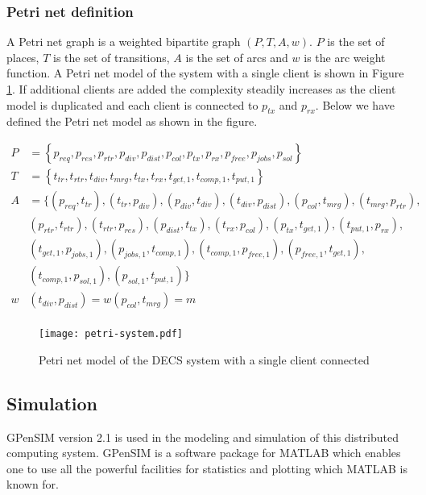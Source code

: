 \subsubsection{Petri net definition}

A Petri net graph is a weighted bipartite graph $(P, T, A, w)$.
$P$ is the set of places, $T$ is the set of transitions, $A$ is the set of arcs and $w$ is the arc weight function.
A Petri net model of the system with a single client is shown in Figure \ref{fig:petri-system}.
If additional clients are added the complexity steadily increases as the client model is duplicated and each client is connected to $p_{tx}$ and $p_{rx}$.
Below we have defined the Petri net model as shown in the figure.

\begin{align*} 
P &= \left\{p_{req}, p_{res}, p_{rtr}, p_{div}, p_{dist}, p_{col}, p_{tx}, p_{rx}, p_{free}, p_{jobs}, p_{sol}\right\} \\
T &= \left\{t_{tr}, t_{rtr}, t_{div}, t_{mrg}, t_{tx}, t_{rx}, t_{get,1}, t_{comp,1}, t_{put,1}\right\} \\
A &= \{(p_{req}, t_{tr}), (t_{tr}, p_{div}), (p_{div}, t_{div}), (t_{div}, p_{dist}), (p_{col}, t_{mrg}), (t_{mrg}, p_{rtr}), \\
&(p_{rtr}, t_{rtr}), (t_{rtr}, p_{res}), (p_{dist}, t_{tx}), (t_{rx}, p_{col}), (p_{tx}, t_{get,1}), (t_{put,1}, p_{rx}), \\
&(t_{get,1}, p_{jobs,1}), (p_{jobs,1}, t_{comp,1}), (t_{comp,1}, p_{free,1}), (p_{free,1}, t_{get,1}), \\
&(t_{comp,1}, p_{sol,1}), (p_{sol,1}, t_{put,1})\} \\
w&(t_{div}, p_{dist}) = w(p_{col}, t_{mrg}) = m \\
\end{align*}

\begin{figure}[htbp]
	\centering 
	\texttt{[image: petri-system.pdf]}
	\caption{Petri net model of the DECS system with a single client connected}
	\label{fig:petri-system}
\end{figure}


\subsection{Simulation}

GPenSIM \cite{gpensim} version 2.1 is used in the modeling and simulation of this distributed computing system.
GPenSIM is a software package for MATLAB which enables one to use all the powerful facilities for statistics and plotting which MATLAB is known for.


